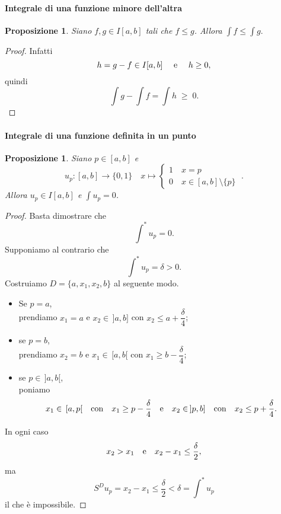 \documentclass{article}
\theoremstyle{plain}
\newtheorem{prop}[thm]{Proposizione}
\theoremstyle{definition}
\theoremstyle{remark}
\begin{document}
\vspace{10pt}

\paragraph{Integrale di una funzione minore dell'altra}
\begin{bxthm}
\begin{prop}
    Siano $f,g\in I[a,b]$ tali che $f\leq g$. Allora \(\int f\leq \int g.\)
\end{prop}
\end{bxthm}
\begin{proof}
    Infatti 
    \[h=g-f\in I[a,b]\quad\textup{ e }\quad h\geq0,\]
    quindi \[\int g-\int f=\int h \;\geq\; 0.\] 
\end{proof}

\vspace{10pt}

\paragraph{Integrale di una funzione definita in un punto}
\begin{bxthm}
\begin{prop}
    Siano $p\in[a,b]$ e
    \[u_p:[a,b]\to\{0,1\}\quad
        x\mapsto\begin{cases}
            1\quad x=p\\
            0\quad x\in[a,b]\setminus \{p\}
        \end{cases}\;.\]
    Allora $u_p\in I[a,b]$ e $\int u_p=0$.
\end{prop}
\end{bxthm}
\begin{proof}
    Basta dimostrare che \[\int^*u_p=0.\] 
    Supponiamo al contrario che \[\int^*u_p=\delta>0.\] 
    Costruiamo $D=\{a,x_1,x_2,b\}$ al seguente modo. 
    \begin{itemize}
        \item Se $p=a$,\\ 
        prendiamo $x_1=a$ e $x_2\in\, ]a,b]$ con $x_2\leq a+\dfrac{\delta}{4}$;
        \item se $p=b$,\\ 
        prendiamo $x_2=b$ e $x_1\in\,[a,b[$ con $x_1\geq b-\dfrac{\delta}{4}$;
        \item se $p\in\,]a,b[$,\\ 
        poniamo 
        \[ x_1\in\,[a,p[\quad\textup{con}\quad x_1\geq p-\dfrac{\delta}{4}\quad\textup{e}\quad x_2\in\,]p,b]\quad\textup{con}\quad x_2\leq p+\dfrac{\delta}{4}. \]
    \end{itemize}
    In ogni caso \[x_2>x_1\quad\textup{e}\quad x_2-x_1\leq \dfrac{\delta}{2},\] ma 
    \[S^Du_p=x_2-x_1\leq \dfrac{\delta}{2}<\delta=\int^*u_p\]
    il che è impossibile.
\end{proof}
\end{document}
